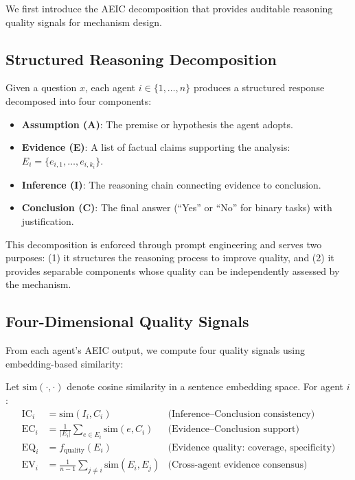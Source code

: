 \documentclass[runningheads]{llncs}
\begin{document}
We first introduce the AEIC decomposition that provides auditable reasoning quality signals for mechanism design.

\subsection{Structured Reasoning Decomposition}

Given a question $x$, each agent $i \in \{1, \ldots, n\}$ produces a structured response decomposed into four components:

\begin{itemize}
    \item \textbf{Assumption (A)}: The premise or hypothesis the agent adopts.
    \item \textbf{Evidence (E)}: A list of factual claims supporting the analysis: $E_i = \{e_{i,1}, \ldots, e_{i,k_i}\}$.
    \item \textbf{Inference (I)}: The reasoning chain connecting evidence to conclusion.
    \item \textbf{Conclusion (C)}: The final answer (``Yes'' or ``No'' for binary tasks) with justification.
\end{itemize}

This decomposition is enforced through prompt engineering and serves two purposes: (1) it structures the reasoning process to improve quality, and (2) it provides separable components whose quality can be independently assessed by the mechanism.

\subsection{Four-Dimensional Quality Signals}

From each agent's AEIC output, we compute four quality signals using embedding-based similarity:

\begin{definition}
Let $\text{sim}(\cdot, \cdot)$ denote cosine similarity in a sentence embedding space. For agent $i$:
\begin{align}
    \text{IC}_i &= \text{sim}(I_i, C_i) & \text{(Inference--Conclusion consistency)} \\
    \text{EC}_i &= \frac{1}{|E_i|}\sum_{e \in E_i} \text{sim}(e, C_i) & \text{(Evidence--Conclusion support)} \\
    \text{EQ}_i &= f_{\text{quality}}(E_i) & \text{(Evidence quality: coverage, specificity)} \\
    \text{EV}_i &= \frac{1}{n-1}\sum_{j \neq i} \text{sim}(E_i, E_j) & \text{(Cross-agent evidence consensus)}
\end{align}
\end{definition}
\end{document}

